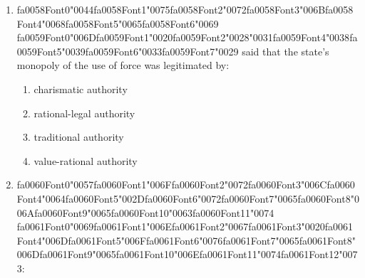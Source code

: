 \documentclass[12pt]{article}
\begin{document}
\begin{enumerate}[label=\arabic*.]
\begin{enumerate}[label=(\alph*)]
    \item many people are cohabiting in long term relationships
    \item the upward curve of remarriages compensates for the drop in first marriages
    \item all of the above
\end{enumerate}
\item {\csname fa0058Font0\endcsname\char"0044}{\csname fa0058Font1\endcsname\char"0075}{\csname fa0058Font2\endcsname\char"0072}{\csname fa0058Font3\endcsname\char"006B}{\csname fa0058Font4\endcsname\char"0068}{\csname fa0058Font5\endcsname\char"0065}{\csname fa0058Font6\endcsname\char"0069} {\csname fa0059Font0\endcsname\char"006D}{\csname fa0059Font1\endcsname\char"0020}{\csname fa0059Font2\endcsname\char"0028}{\char"0031}{\csname fa0059Font4\endcsname\char"0038}{\csname fa0059Font5\endcsname\char"0039}{\csname fa0059Font6\endcsname\char"0033}{\csname fa0059Font7\endcsname\char"0029} said that the state's monopoly of the use of force was legitimated by:
\begin{enumerate}[label=(\alph*)]
    \item charismatic authority
    \item rational-legal authority
    \item traditional authority
    \item value-rational authority
\end{enumerate}
\item {\csname fa0060Font0\endcsname\char"0057}{\csname fa0060Font1\endcsname\char"006F}{\csname fa0060Font2\endcsname\char"0072}{\csname fa0060Font3\endcsname\char"006C}{\csname fa0060Font4\endcsname\char"0064}{\csname fa0060Font5\endcsname\char"002D}{\csname fa0060Font6\endcsname\char"0072}{\csname fa0060Font7\endcsname\char"0065}{\csname fa0060Font8\endcsname\char"006A}{\csname fa0060Font9\endcsname\char"0065}{\csname fa0060Font10\endcsname\char"0063}{\csname fa0060Font11\endcsname\char"0074} {\csname fa0061Font0\endcsname\char"0069}{\csname fa0061Font1\endcsname\char"006E}{\csname fa0061Font2\endcsname\char"0067}{\csname fa0061Font3\endcsname\char"0020}{\csname fa0061Font4\endcsname\char"006D}{\csname fa0061Font5\endcsname\char"006F}{\csname fa0061Font6\endcsname\char"0076}{\csname fa0061Font7\endcsname\char"0065}{\csname fa0061Font8\endcsname\char"006D}{\csname fa0061Font9\endcsname\char"0065}{\csname fa0061Font10\endcsname\char"006E}{\csname fa0061Font11\endcsname\char"0074}{\csname fa0061Font12\endcsname\char"0073}:
\begin{enumerate}[label=(\alph*)]

\end{enumerate}
\end{enumerate}
\end{document}
